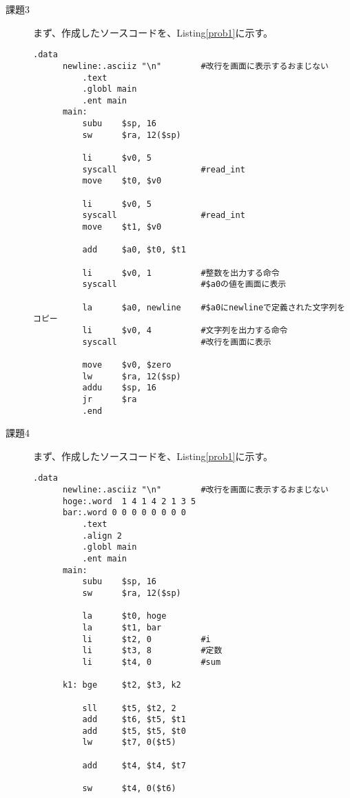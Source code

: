 \documentclass{jsarticle}
\begin{document}
\begin{description}
      \item[課題3]
      まず、作成したソースコードを、Listing\ref{prob1}に示す。
      \begin{lstlisting}[caption=課題1のソースコード, label=prob1]
          .data
      newline:.asciiz "\n"        #改行を画面に表示するおまじない
          .text
          .globl main
          .ent main
      main:
          subu    $sp, 16
          sw      $ra, 12($sp)

          li      $v0, 5
          syscall                 #read_int
          move    $t0, $v0

          li      $v0, 5
          syscall                 #read_int
          move    $t1, $v0

          add     $a0, $t0, $t1

          li      $v0, 1          #整数を出力する命令
          syscall                 #$a0の値を画面に表示

          la      $a0, newline    #$a0にnewlineで定義された文字列をコピー
          li      $v0, 4          #文字列を出力する命令
          syscall                 #改行を画面に表示

          move    $v0, $zero
          lw      $ra, 12($sp)
          addu    $sp, 16
          jr      $ra
          .end
      \end{lstlisting}



      \item[課題4]
      まず、作成したソースコードを、Listing\ref{prob1}に示す。
      \begin{lstlisting}[caption=課題1のソースコード, label=prob1]
          .data
      newline:.asciiz "\n"        #改行を画面に表示するおまじない
      hoge:.word  1 4 1 4 2 1 3 5
      bar:.word 0 0 0 0 0 0 0 0
          .text
          .align 2
          .globl main
          .ent main
      main:
          subu    $sp, 16
          sw      $ra, 12($sp)

          la      $t0, hoge
          la      $t1, bar
          li      $t2, 0          #i
          li      $t3, 8          #定数
          li      $t4, 0          #sum

      k1: bge     $t2, $t3, k2

          sll     $t5, $t2, 2
          add     $t6, $t5, $t1
          add     $t5, $t5, $t0
          lw      $t7, 0($t5)

          add     $t4, $t4, $t7

          sw      $t4, 0($t6)


\end{lstlisting}
\end{description}
\end{document}
